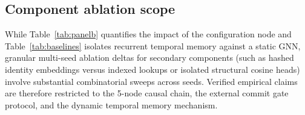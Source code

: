 \subsection{Component ablation scope}

While Table~\ref{tab:panelb} quantifies the impact of the configuration node and Table~\ref{tab:baselines}
isolates recurrent temporal memory against a static GNN, granular multi-seed ablation deltas
for secondary components (such as hashed identity embeddings versus indexed lookups or
isolated structural cosine heads) involve substantial combinatorial sweeps across seeds.
Verified empirical claims are therefore restricted to the 5-node causal chain, the
external commit gate protocol, and the dynamic temporal memory mechanism.
